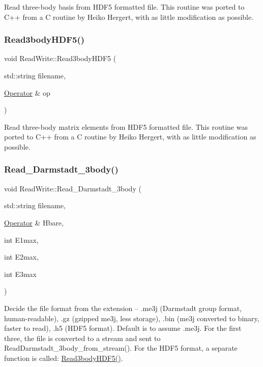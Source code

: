 Read three-\/body basis from H\+D\+F5 formatted file. This routine was ported to C++ from a C routine by Heiko Hergert, with as little modification as possible. \mbox{\label{classReadWrite_aecf5aed45944f3bd24c376478ee939dc}} 
\subsubsection{\texorpdfstring{Read3body\+H\+D\+F5()}{Read3bodyHDF5()}}
{\footnotesize\ttfamily void Read\+Write\+::\+Read3body\+H\+D\+F5 (\begin{DoxyParamCaption}\item[{std\+::string}]{filename,  }\item[{\hyperlink{classOperator}{Operator} \&}]{op }\end{DoxyParamCaption})}

Read three-\/body matrix elements from H\+D\+F5 formatted file. This routine was ported to C++ from a C routine by Heiko Hergert, with as little modification as possible. \mbox{\label{classReadWrite_a5718d535d7e865cb16229cb5c7f8b16d}} 
\subsubsection{\texorpdfstring{Read\+\_\+\+Darmstadt\+\_\+3body()}{Read\_Darmstadt\_3body()}}
{\footnotesize\ttfamily void Read\+Write\+::\+Read\+\_\+\+Darmstadt\+\_\+3body (\begin{DoxyParamCaption}\item[{std\+::string}]{filename,  }\item[{\hyperlink{classOperator}{Operator} \&}]{Hbare,  }\item[{int}]{E1max,  }\item[{int}]{E2max,  }\item[{int}]{E3max }\end{DoxyParamCaption})}

Decide the file format from the extension -- .me3j (Darmstadt group format, human-\/readable), .gz (gzipped me3j, less storage), .bin (me3j converted to binary, faster to read), .h5 (H\+D\+F5 format). Default is to assume .me3j. For the first three, the file is converted to a stream and sent to Read\+Darmstadt\+\_\+3body\+\_\+from\+\_\+stream(). For the H\+D\+F5 format, a separate function is called\+: \hyperlink{classReadWrite_aecf5aed45944f3bd24c376478ee939dc}{Read3body\+H\+D\+F5()}. \mbox{\label{classReadWrite_a44acf6835321a8bee6a795523728da2e}} 
